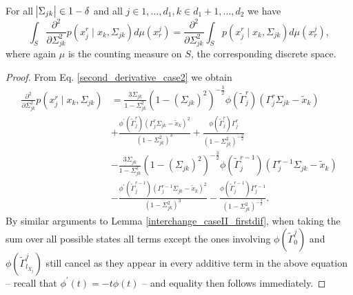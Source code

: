 \begin{corollary}
    For all $\abs{\Sigma_{jk}} \in 1-\delta$ and all $j \in 1, \dots, d_1, k\in d_1 +1, \dots, d_2$ we have
    \begin{equation*}
        \int_S \frac{\partial^2 }{\partial \Sigma_{jk}^2} p(x_j^{r} \mid x_{k}, \Sigma_{jk}) d\mu(x_r^j)= \frac{\partial^2}{\partial \Sigma_{jk}^2} \int_S p(x_j^{r} \mid x_{k}, \Sigma_{jk}) d\mu(x_r^j),
    \end{equation*}
    where again $\mu$ is the counting measure on $S$, the corresponding discrete space.
    
    \begin{proof}
        From Eq. \eqref{second_derivative_case2} we obtain 
        \begin{equation*}
            \begin{split}
                \frac{\partial^2 }{\partial \Sigma_{jk}^2} p(x_j^{r} \mid x_{k}, \Sigma_{jk}) 
                &= \frac{3\Sigma_{jk}}{1-\Sigma_{jk}^2} (1-(\Sigma_{jk})^2)^{-\frac{3}{2}} \phi({\tilde{\Gamma}}_j^{r})({\Gamma}_j^r\Sigma_{jk} - {\tilde{x}}_{k}) \\
                &+\frac{\phi^\prime({\tilde{\Gamma}}_j^{r})({\Gamma}_j^r\Sigma_{jk} - {\tilde{x}}_{k})^2}{(1-\Sigma_{jk}^2)^3} + \frac{\phi({\tilde{\Gamma}}_j^{r}){\Gamma}_j^{r}}{(1-\Sigma_{jk}^2)^{-\frac{3}{2}}} \\
                &- \frac{3\Sigma_{jk}}{1-\Sigma_{jk}^2} (1-(\Sigma_{jk})^2)^{-\frac{3}{2}} \phi({\tilde{\Gamma}}_j^{r-1})({\Gamma}_j^{r-1}\Sigma_{jk} - {\tilde{x}}_{k}) \\
                &- \frac{\phi^\prime({\tilde{\Gamma}}_j^{r-1})({\Gamma}_j^{r-1}\Sigma_{jk} - {\tilde{x}}_{k})^2}{(1-\Sigma_{jk}^2)^3} - \frac{\phi({\tilde{\Gamma}}_j^{r-1}){\Gamma}_j^{r-1}}{(1-\Sigma_{jk}^2)^{-\frac{3}{2}}}.
            \end{split}
        \end{equation*}
        By similar arguments to Lemma \ref{interchange_caseII_firstdif}, when taking the sum over all possible states all terms except the ones involving $\phi({\tilde{\Gamma}}^j_{0})$ and $\phi({\tilde{\Gamma}}^j_{l_{X_j}})$ still cancel as they appear in every additive term in the above equation -- recall that $\phi^\prime(t) = -t\phi(t)$ -- and equality then follows immediately. 
    \end{proof}
\end{corollary}    



